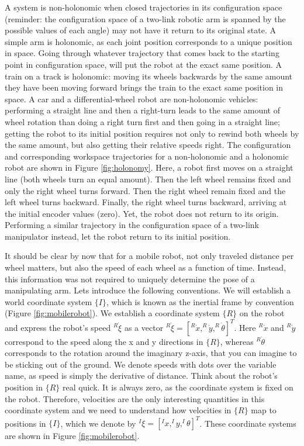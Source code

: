 A system is non-holonomic when closed trajectories in its configuration space (reminder: the configuration space of a two-link robotic arm is spanned by the possible values of each angle) may not have it return to its original state.  A simple arm is holonomic, as each joint position corresponds to a unique position in space. Going through whatever trajectory that comes back to the starting point in configuration space, will put the robot at the exact same position. A train on  a track is holonomic: moving its wheels backwards by the same amount they have been moving forward brings the train to the exact same position in space. A car and a differential-wheel robot are non-holonomic vehicles: performing a straight line and then a right-turn leads to the same amount of wheel rotation than doing a right turn first and then going in a straight line; getting the robot to its initial position requires not only to rewind both wheels by the same amount, but also getting their relative speeds right. The configuration and corresponding workspace trajectories for a non-holonomic and a holonomic robot are shown in Figure \ref{fig:holonomy}. Here, a robot first moves on a straight line (both wheels turn an equal amount). Then the left wheel remains fixed and only the right wheel turns forward. Then the right wheel remain fixed and the left wheel turns backward. Finally, the right wheel turns backward, arriving at the initial encoder values (zero). Yet, the robot does not return to its origin. Performing a similar trajectory in the configuration space of a two-link manipulator instead, let the robot return to its initial position. 

It should be clear by now that for a mobile robot, not only traveled distance per wheel matters, but also the speed of each wheel as a function of time. Instead, this information was not required to uniquely determine the pose of a manipulating arm. Lets introduce the following conventions. We will establish a world coordinate system $\{I\}$, which is known as the inertial frame by convention (Figure \ref{fig:mobilerobot}). We establish a coordinate system $\{R\}$ on the robot and express the robot's speed $^R\dot{\xi}$ as a vector $ ^R\dot{\xi}=[^R\dot{x}, ^R\dot{y}, ^R\dot{\theta}]^T$. Here $^R\dot{x}$ and $^R\dot{y}$ correspond to the speed along the x and y directions in $\{R\}$, whereas $^R\dot{\theta}$ corresponds to the rotation around the imaginary z-axis, that you can imagine to be sticking out of the ground. We denote speeds with dots over the variable name, as speed is simply the derivative of distance.  Think about the robot's position in $\{R\}$ real quick. It is always zero, as the coordinate system is fixed on the robot. Therefore, velocities are the only interesting quantities in this coordinate system and we need to understand how velocities in $\{R\}$ map to positions in $ \{I\}$, which we denote by $^I\xi=[^Ix, ^Iy, ^I\theta]^T$. These coordinate systems are shown in Figure \ref{fig:mobilerobot}. 

